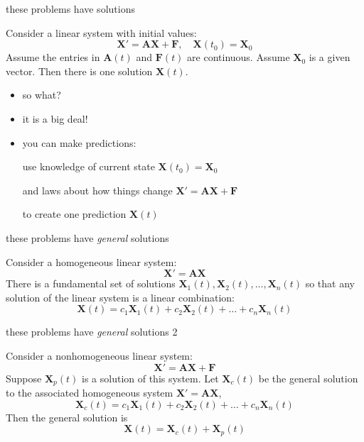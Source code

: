 \documentclass[urlcolor=blue,dvipsnames]{beamer}
\newcommand{\bA}{\mathbf{A}}
\newcommand{\bF}{\mathbf{F}}
\newcommand{\bX}{\mathbf{X}}
\begin{document}
\begin{frame}{these problems have solutions}

\begin{theorem}  Consider a linear system with initial values:
    $$\bX' = \bA \bX + \bF, \quad \bX(t_0)=\bX_0$$
Assume the entries in $\bA(t)$ and $\bF(t)$ are continuous.  Assume $\bX_0$ is a given vector.  Then there is one solution $\bX(t)$.
\end{theorem}

\bigskip
\begin{itemize}
\item so what?
\item it is a big deal!
\item \alert{you can make predictions}:

use knowledge of current state \hfill $\bX(t_0)=\bX_0$

and laws about how things change \hfill $\bX' = \bA \bX + \bF$

to create one prediction \hfill $\bX(t)$
\end{itemize}
\end{frame}


\begin{frame}{these problems have \emph{general} solutions}

\begin{theorem}  Consider a \alert{homogeneous} linear system:
    $$\bX' = \bA \bX$$
There is a \alert{fundamental set} of solutions $\bX_1(t), \bX_2(t), \dots, \bX_n(t)$ so that any solution of the linear system is a linear combination:
    $$\bX(t) = c_1 \bX_1(t) + c_2 \bX_2(t) + \dots + c_n \bX_n(t)$$
\end{theorem}
\end{frame}


\begin{frame}{these problems have \emph{general} solutions 2}

\begin{theorem}  Consider a \alert{non}homogeneous linear system:
    $$\bX' = \bA \bX + \bF$$
Suppose $\bX_p(t)$ is a solution of this system.  Let $\bX_c(t)$ be the general solution to the associated homogeneous system $\bX' = \bA \bX$,
    $$\bX_c(t) = c_1 \bX_1(t) + c_2 \bX_2(t) + \dots + c_n \bX_n(t)$$
Then the general solution is
    $$\bX(t) = \bX_c(t) + \bX_p(t)$$
\end{theorem}
\end{frame}
\end{document}
